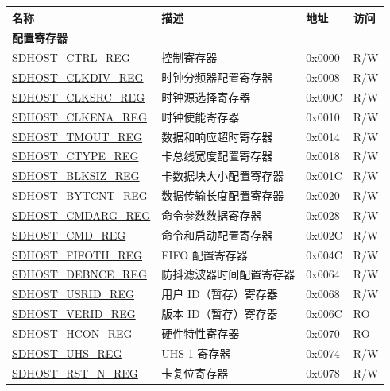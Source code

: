 \begin{longtable}{ | p{6cm} | p{7.0cm} | p{1.3cm} | p{1.2cm} | }
\hline\rowcolor{lightgray}
名称 & 描述 &  地址 & 访问 \\ \hline
\endhead
\multicolumn{4}{|l|}{\textbf{配置寄存器}} \\ \hline
\hyperref[regdesc:SDHOSTCTRLREG]{SDHOST\_CTRL\_REG} & 控制寄存器 & 0x0000 & R/W \\ \hline
\hyperref[regdesc:SDHOSTCLKDIVREG]{SDHOST\_CLKDIV\_REG} & 时钟分频器配置寄存器 & 0x0008 & R/W \\ \hline
\hyperref[regdesc:SDHOSTCLKSRCREG]{SDHOST\_CLKSRC\_REG} & 时钟源选择寄存器 & 0x000C & R/W \\ \hline
\hyperref[regdesc:SDHOSTCLKENAREG]{SDHOST\_CLKENA\_REG} & 时钟使能寄存器 & 0x0010 & R/W \\ \hline
\hyperref[regdesc:SDHOSTTMOUTREG]{SDHOST\_TMOUT\_REG} & 数据和响应超时寄存器 & 0x0014 & R/W \\ \hline
\hyperref[regdesc:SDHOSTCTYPEREG]{SDHOST\_CTYPE\_REG} & 卡总线宽度配置寄存器 & 0x0018 & R/W \\ \hline
\hyperref[regdesc:SDHOSTBLKSIZREG]{SDHOST\_BLKSIZ\_REG} & 卡数据块大小配置寄存器 & 0x001C & R/W \\ \hline
\hyperref[regdesc:SDHOSTBYTCNTREG]{SDHOST\_BYTCNT\_REG} & 数据传输长度配置寄存器 & 0x0020 & R/W \\ \hline
\hyperref[regdesc:SDHOSTCMDARGREG]{SDHOST\_CMDARG\_REG} & 命令参数数据寄存器 & 0x0028 & R/W \\ \hline
\hyperref[regdesc:SDHOSTCMDREG]{SDHOST\_CMD\_REG} & 命令和启动配置寄存器 & 0x002C & R/W \\ \hline
\hyperref[regdesc:SDHOSTFIFOTHREG]{SDHOST\_FIFOTH\_REG} & FIFO 配置寄存器 & 0x004C & R/W \\ \hline
\hyperref[regdesc:SDHOSTDEBNCEREG]{SDHOST\_DEBNCE\_REG} & 防抖滤波器时间配置寄存器 & 0x0064 & R/W \\ \hline
\hyperref[regdesc:SDHOSTUSRIDREG]{SDHOST\_USRID\_REG} & 用户 ID（暂存）寄存器 & 0x0068 & R/W \\ \hline
\hyperref[regdesc:VERIDREG]{SDHOST\_VERID\_REG} & 版本 ID（暂存）寄存器 & 0x{}006C & RO \\ \hline
\hyperref[regdesc:HCONREG]{SDHOST\_HCON\_REG} & 硬件特性寄存器 & 0x{}0070 & RO \\ \hline
\hyperref[regdesc:SDHOSTUHSREG]{SDHOST\_UHS\_REG} & UHS-1 寄存器 & 0x0074 & R/W \\ \hline
\hyperref[regdesc:SDHOSTRSTNREG]{SDHOST\_RST\_N\_REG} & 卡复位寄存器 & 0x0078 & R/W \\ \hline

\end{longtable}
